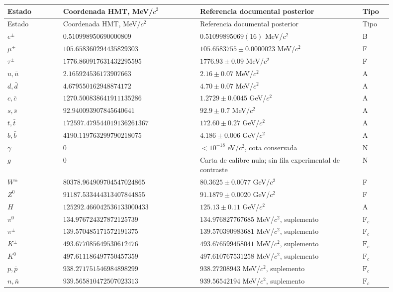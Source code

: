 \begingroup
\small
\setlength{\tabcolsep}{3pt}
\begin{longtable}{p{0.13\linewidth}p{0.32\linewidth}p{0.38\linewidth}p{0.07\linewidth}}
\toprule
Estado & Coordenada HMT, MeV/\(c^2\) & Referencia documental posterior & Tipo\\
\midrule
\endfirsthead
\toprule
Estado & Coordenada HMT, MeV/\(c^2\) & Referencia documental posterior & Tipo\\
\midrule
\endhead
\bottomrule
\endfoot
\(e^\pm\) & \(0.510998950\allowbreak690000809\) & \(0.51099895069(16)\) MeV/\(c^2\) & B\\
\(\mu^\pm\) & \(105.658360294\allowbreak435829303\) & \(105.6583755\pm0.0000023\) MeV/\(c^2\) & F\\
\(\tau^\pm\) & \(1776.860917631\allowbreak432295595\) & \(1776.93\pm0.09\) MeV/\(c^2\) & F\\
\(u,\bar u\) & \(2.165924536\allowbreak173907663\) & \(2.16\pm0.07\) MeV/\(c^2\) & A\\
\(d,\bar d\) & \(4.679550162\allowbreak948874172\) & \(4.70\pm0.07\) MeV/\(c^2\) & A\\
\(c,\bar c\) & \(1270.500838641\allowbreak911135286\) & \(1.2729\pm0.0045\) GeV/\(c^2\) & A\\
\(s,\bar s\) & \(92.940093907\allowbreak845640641\) & \(92.9\pm0.7\) MeV/\(c^2\) & A\\
\(t,\bar t\) & \(172597.479544019\allowbreak136261367\) & \(172.60\pm0.27\) GeV/\(c^2\) & A\\
\(b,\bar b\) & \(4190.119763299\allowbreak790218075\) & \(4.186\pm0.006\) GeV/\(c^2\) & A\\
\(\gamma\) & \(0\) & \(<10^{-18}\) eV/\(c^2\), cota conservada & N\\
\(g\) & \(0\) & Carta de calibre nula; sin fila experimental de contraste & N\\
\(W^\pm\) & \(80378.964909704\allowbreak547024865\) & \(80.3625\pm0.0077\) GeV/\(c^2\) & F\\
\(Z^0\) & \(91187.533444313\allowbreak407844855\) & \(91.1879\pm0.0020\) GeV/\(c^2\) & F\\
\(H\) & \(125292.466042536\allowbreak133000433\) & \(125.13\pm0.11\) GeV/\(c^2\) & A\\
\(\pi^0\) & \(134.976724327\allowbreak872125739\) & \(134.976827767685\) MeV/\(c^2\), suplemento & \(\mathrm F_c\)\\
\(\pi^\pm\) & \(139.570485171\allowbreak572191375\) & \(139.570390983681\) MeV/\(c^2\), suplemento & \(\mathrm F_c\)\\
\(K^\pm\) & \(493.677085649\allowbreak530612476\) & \(493.676599458041\) MeV/\(c^2\), suplemento & \(\mathrm F_c\)\\
\(K^0\) & \(497.611186497\allowbreak750457359\) & \(497.610767531258\) MeV/\(c^2\), suplemento & \(\mathrm F_c\)\\
\(p,\bar p\) & \(938.271751546\allowbreak984898299\) & \(938.27208943\) MeV/\(c^2\), suplemento & \(\mathrm F_c\)\\
\(n,\bar n\) & \(939.565810472\allowbreak507023313\) & \(939.56542194\) MeV/\(c^2\), suplemento & \(\mathrm F_c\)\\
\end{longtable}
\endgroup

